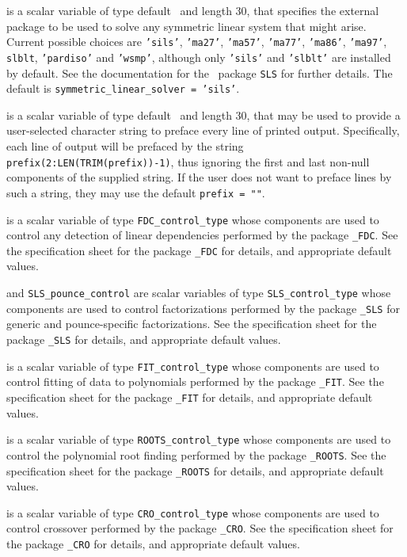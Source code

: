 \documentclass{galahad}
\begin{document}
\begin{description}
 is a scalar variable of type default \character\
and length 30, that specifies the external package to be used to
solve any symmetric linear system that might arise. Current possible
choices are {\tt 'sils'}, {\tt 'ma27'}, {\tt 'ma57'}, {\tt 'ma77'},
{\tt 'ma86'}, {\tt 'ma97'}, {\tt slblt}, {\tt 'pardiso'}
and {\tt 'wsmp'},
although only {\tt 'sils'} and {\tt 'slblt'} are installed by default.
See the documentation for the \galahad\ package {\tt SLS} for further details.
The default is {\tt symmetric\_linear\_solver = 'sils'}.

 is a scalar variable of type default \character\
and length 30, that may be used to provide a user-selected
character string to preface every line of printed output.
Specifically, each line of output will be prefaced by the string
{\tt prefix(2:LEN(TRIM(prefix))-1)},
thus ignoring the first and last non-null components of the
supplied string. If the user does not want to preface lines by such
a string, they may use the default {\tt prefix = ""}.

 is a scalar variable of type
{\tt FDC\_control\_type}
whose components are used to control any detection of linear dependencies
performed by the package
{\tt \libraryname\_FDC}.
See the specification sheet for the package
{\tt \libraryname\_FDC}
for details, and appropriate default values.

 and {\tt SLS\_pounce\_control}
are scalar variables of type
{\tt SLS\_control\_type}
whose components are used to control factorizations
performed by the package
{\tt \libraryname\_SLS} for generic and pounce-specific factorizations.
See the specification sheet for the package
{\tt \libraryname\_SLS}
for details, and appropriate default values.

 is a scalar variable of type
{\tt FIT\_control\_type}
whose components are used to control fitting of data to polynomials
performed by the package
{\tt \libraryname\_FIT}.
See the specification sheet for the package
{\tt \libraryname\_FIT}
for details, and appropriate default values.

 is a scalar variable of type
{\tt ROOTS\_control\_type}
whose components are used to control the polynomial root finding
performed by the package
{\tt \libraryname\_ROOTS}.
See the specification sheet for the package
{\tt \libraryname\_ROOTS}
for details, and appropriate default values.

 is a scalar variable of type
{\tt CRO\_control\_type}
whose components are used to control crossover
performed by the package
{\tt \libraryname\_CRO}.
See the specification sheet for the package
{\tt \libraryname\_CRO}
for details, and appropriate default values.

\end{description}
\end{document}
